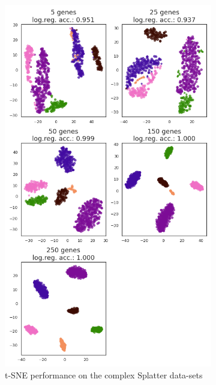 \begin{figure}[h]
\begin{subfigure}{.3\textwidth}
  \centering
  \includegraphics[width=\linewidth]{figs/TSNE_complex.png}
  \caption{\small t-SNE performance on the complex Splatter data-sets}
  \label{fig:tsne_complex}
\end{subfigure}\hspace{30px}%
\begin{subfigure}{.3\textwidth}
  \centering

\end{subfigure}
\end{figure}
